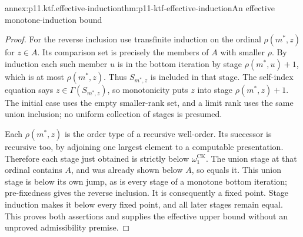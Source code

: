 \begin{annexitem}{annex:p11.ktf.effective-induction}{thm:p11-ktf-effective-induction}{An effective monotone-induction bound}
\begin{proof}
For the reverse inclusion use transfinite induction on the ordinal
\(\rho(m^*,z)\) for \(z\in A\). Its comparison set is precisely
the members of \(A\) with smaller \(\rho\). By induction each
such member \(u\) is in the bottom iteration by stage
\(\rho(m^*,u)+1\), which is at most \(\rho(m^*,z)\).
Thus \(S_{m^*,z}\) is included in that stage. The self-index
equation says \(z\in\Gamma(S_{m^*,z})\), so monotonicity puts
\(z\) into stage \(\rho(m^*,z)+1\). The initial case uses
the empty smaller-rank set, and a limit rank uses the same union
inclusion; no uniform collection of stages is presumed.

Each \(\rho(m^*,z)\) is the order type of a recursive well-order.
Its successor is recursive too, by adjoining one largest element to
a computable presentation. Therefore each stage just obtained is
strictly below \(\omega_1^{\mathrm{CK}}\). The union stage at
that ordinal contains \(A\), and was already shown below \(A\),
so equals it. This union stage is below its own jump, as is every
stage of a monotone bottom iteration; pre-fixedness gives the reverse
inclusion. It is consequently a fixed point. Stage induction makes
it below every fixed point, and all later stages remain equal.
This proves both assertions and supplies the effective upper bound
without an unproved admissibility premise.
\end{proof}
\end{annexitem}

